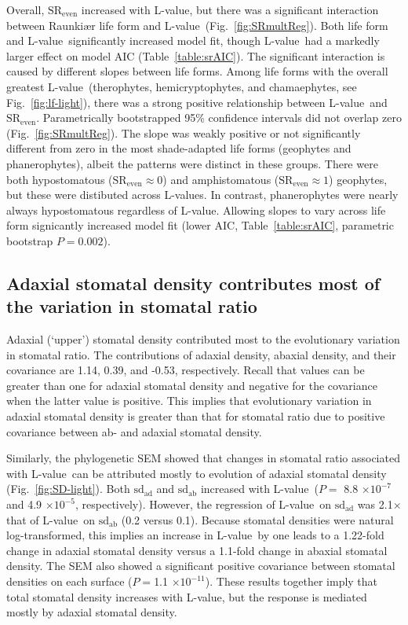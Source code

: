 \documentclass[12pt, oneside]{article}
\newcommand{\el}{L-value}
\begin{document}
Overall, $\mathrm{SR_{even}}$ increased with \el, but there was a significant interaction between Raunki\ae r life form and \el~(Fig.~\ref{fig:SRmultReg}). Both life form and \el~significantly increased model fit, though \el~had a markedly larger effect on model AIC (Table~\ref{table:srAIC}). The significant interaction is caused by different slopes between life forms. Among life forms with the overall greatest \el~(therophytes, hemicryptophytes, and chamaephytes, see Fig.~\ref{fig:lf-light}), there was a strong positive relationship between \el~and $\mathrm{SR_{even}}$. Parametrically bootstrapped 95\% confidence intervals did not overlap zero (Fig.~\ref{fig:SRmultReg}). The slope was weakly positive or not significantly different from zero in the most shade-adapted life forms (geophytes and phanerophytes), albeit the patterns were distinct in these groups. There were both hypostomatous ($\mathrm{SR_{even}} \approx 0$) and amphistomatous ($\mathrm{SR_{even}} \approx 1$) geophytes, but these were distibuted across \el s. In contrast, phanerophytes were nearly always hypostomatous regardless of \el. Allowing slopes to vary across life form signicantly increased model fit (lower AIC, Table~\ref{table:srAIC}, parametric bootstrap $P = 0.002$).

\subsection*{Adaxial stomatal density contributes most of the variation in stomatal ratio}

Adaxial (`upper') stomatal density contributed most to the evolutionary variation in stomatal ratio. The contributions of adaxial density, abaxial density, and their covariance are 1.14, 0.39, and -0.53, respectively. Recall that values can be greater than one for adaxial stomatal density and negative for the covariance when the latter value is positive. This implies that evolutionary variation in adaxial stomatal density is greater than that for stomatal ratio due to positive covariance between ab- and adaxial stomatal density.

Similarly, the phylogenetic SEM showed that changes in stomatal ratio associated with \el~can be attributed mostly to evolution of adaxial stomatal density (Fig.~\ref{fig:SD-light}). Both $\mathrm{sd_{ad}}$ and $\mathrm{sd_{ab}}$ increased with \el~($P =$ 8.8 $\times10^{-7}$ and 4.9 $\times10^{-5}$, respectively). However, the regression of \el~on $\mathrm{sd_{ad}}$ was 2.1$\times$ that of \el~on $\mathrm{sd_{ab}}$ (0.2 versus 0.1). Because stomatal densities were natural log-transformed, this implies an increase in \el~by one leads to a 1.22-fold change in adaxial stomatal density versus a 1.1-fold change in abaxial stomatal density. The SEM also showed a significant positive covariance between stomatal densities on each surface ($P = $1.1 $\times10^{-11}$). These results together imply that total stomatal density increases with \el, but the response is mediated mostly by adaxial stomatal density.
\end{document}

